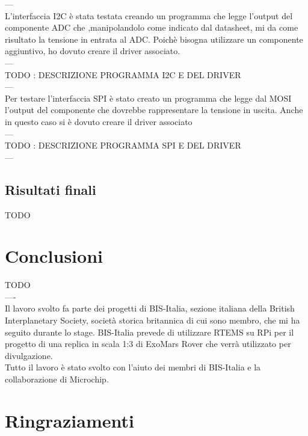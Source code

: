 \documentclass[12pt, a4paper, titlepage, oneside]{book}
\begin{document}
\begin{flushleft}
---\\
L'interfaccia I2C è stata testata creando un programma che legge l'output del componente ADC che ,manipolandolo come indicato dal datasheet, mi da come risultato la tensione in entrata al ADC. Poichè bisogna utilizzare un componente aggiuntivo, ho dovuto creare il driver associato.\\
---\\
TODO : DESCRIZIONE PROGRAMMA I2C E DEL DRIVER\\
---\\
Per testare l'interfaccia SPI è stato creato un programma che legge dal MOSI l'output del componente che dovrebbe rappresentare la tensione in uscita. Anche in questo caso si è dovuto creare il driver associato \\
---\\
TODO : DESCRIZIONE PROGRAMMA SPI E DEL DRIVER\\
---\\
\section{Risultati finali}
TODO\\
\chapter{Conclusioni}
TODO\\
----\\

Il lavoro svolto fa parte dei progetti di BIS-Italia, sezione italiana della British Interplanetary Society, società storica britannica di cui sono membro, che mi ha seguito durante lo stage. BIS-Italia prevede di utilizzare RTEMS su RPi per il progetto di una replica in scala 1:3 di ExoMars Rover che verrà utilizzato per divulgazione.\\
Tutto il lavoro è stato svolto con l'aiuto dei membri di BIS-Italia e la collaborazione di Microchip.
\chapter*{Ringraziamenti}
\printbibliography
\end{flushleft}
\end{document}
